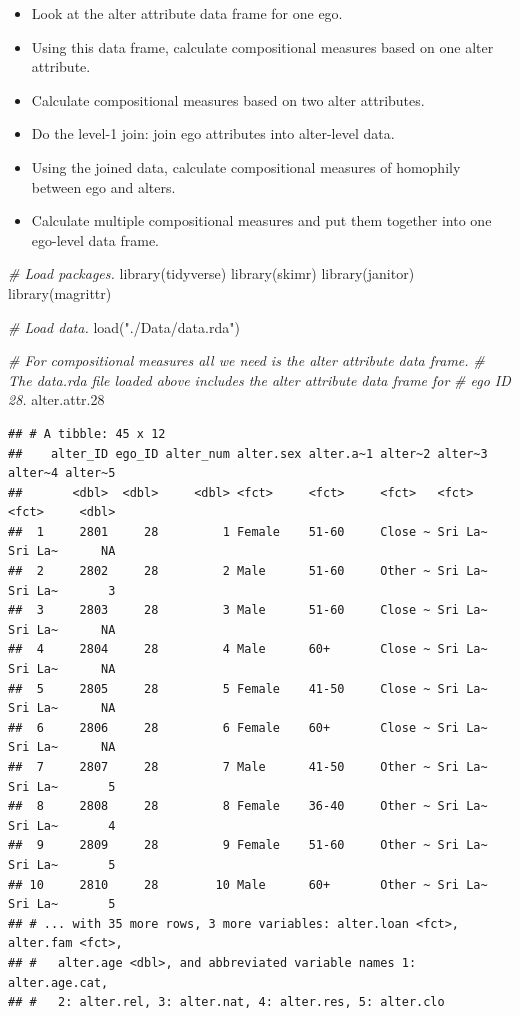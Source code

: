 \documentclass[
]{book}
\newenvironment{Shaded}{\begin{snugshade}}{\end{snugshade}}
\newcommand{\CommentTok}[1]{\textcolor[rgb]{0.56,0.35,0.01}{\textit{#1}}}
\newcommand{\FloatTok}[1]{\textcolor[rgb]{0.00,0.00,0.81}{#1}}
\newcommand{\FunctionTok}[1]{\textcolor[rgb]{0.00,0.00,0.00}{#1}}
\newcommand{\NormalTok}[1]{#1}
\newcommand{\StringTok}[1]{\textcolor[rgb]{0.31,0.60,0.02}{#1}}
\providecommand{\tightlist}{%
  \setlength{\itemsep}{0pt}\setlength{\parskip}{0pt}}
\begin{document}
\begin{itemize}
  \begin{itemize}
  \tightlist
  \item
    Look at the alter attribute data frame for one ego.
  \item
    Using this data frame, calculate compositional measures based on one alter attribute.
  \item
    Calculate compositional measures based on two alter attributes.
  \item
    Do the level-1 join: join ego attributes into alter-level data.
  \item
    Using the joined data, calculate compositional measures of homophily between ego and alters.
  \item
    Calculate multiple compositional measures and put them together into one ego-level data frame.
  \end{itemize}
\end{itemize}

\begin{Shaded}
\begin{Highlighting}[]
\CommentTok{\# Load packages.}
\FunctionTok{library}\NormalTok{(tidyverse)}
\FunctionTok{library}\NormalTok{(skimr)}
\FunctionTok{library}\NormalTok{(janitor)}
\FunctionTok{library}\NormalTok{(magrittr)}

\CommentTok{\# Load data.}
\FunctionTok{load}\NormalTok{(}\StringTok{"./Data/data.rda"}\NormalTok{)}

\CommentTok{\# For compositional measures all we need is the alter attribute data frame.}
\CommentTok{\# The data.rda file loaded above includes the alter attribute data frame for}
\CommentTok{\# ego ID 28.}
\NormalTok{alter.attr}\FloatTok{.28}
\end{Highlighting}
\end{Shaded}

\begin{verbatim}
## # A tibble: 45 x 12
##    alter_ID ego_ID alter_num alter.sex alter.a~1 alter~2 alter~3 alter~4 alter~5
##       <dbl>  <dbl>     <dbl> <fct>     <fct>     <fct>   <fct>   <fct>     <dbl>
##  1     2801     28         1 Female    51-60     Close ~ Sri La~ Sri La~      NA
##  2     2802     28         2 Male      51-60     Other ~ Sri La~ Sri La~       3
##  3     2803     28         3 Male      51-60     Close ~ Sri La~ Sri La~      NA
##  4     2804     28         4 Male      60+       Close ~ Sri La~ Sri La~      NA
##  5     2805     28         5 Female    41-50     Close ~ Sri La~ Sri La~      NA
##  6     2806     28         6 Female    60+       Close ~ Sri La~ Sri La~      NA
##  7     2807     28         7 Male      41-50     Other ~ Sri La~ Sri La~       5
##  8     2808     28         8 Female    36-40     Other ~ Sri La~ Sri La~       4
##  9     2809     28         9 Female    51-60     Other ~ Sri La~ Sri La~       5
## 10     2810     28        10 Male      60+       Other ~ Sri La~ Sri La~       5
## # ... with 35 more rows, 3 more variables: alter.loan <fct>, alter.fam <fct>,
## #   alter.age <dbl>, and abbreviated variable names 1: alter.age.cat,
## #   2: alter.rel, 3: alter.nat, 4: alter.res, 5: alter.clo
\end{verbatim}
\end{document}
